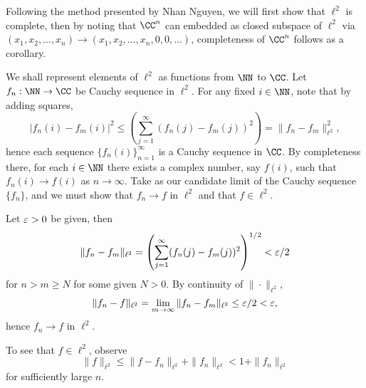 \documentclass{homework}
\begin{document}
\begin{solution}
  Following the method presented by Nhan Nguyen, we will first show that $\ell^2$ is complete, then by noting that $\CC^n$ can embedded as closed subspace of $\ell^2$ via $(x_1,x_2,\dots,x_n) \to (x_1,x_2,\dots,x_n,0,0,\dots)$, completeness of $\CC^n$ follows as a corollary.   

  We shall represent elements of $\ell^2$ as functions from $\NN$ to $\CC$.  Let $f_n:\NN \to \CC$ be Cauchy sequence in $\ell^2$.  For any  fixed $i \in \NN$, note that by adding squares,
  $$|f_n(i) - f_m(i)|^2 \le \left( \sum_{j=1}^\infty (f_n(j) - f_m(j))^2 \right) = \|f_n - f_m\|_{\ell^2}^2,$$
  hence each sequence $\{f_n(i)\}_{n=1}^\infty$ is a Cauchy sequence in $\CC$. By completeness there, for each $i \in \NN$ there exists a complex number, say $f(i)$, such that $f_n(i) \to f(i)$ as $n\to \infty$.  Take as our candidate limit of the Cauchy sequence $\{f_n \}$, and we must show that $f_n \to f$ in $\ell^2$ and that $f\in \ell^2$.

  Let $\varepsilon > 0$ be given, then 
  $$
    \| f_n - f_m \|_{\ell^2} = \left( \sum_{j=1}^\infty (f_n(j) - f_m(j) )^2\right)^{1/2} < \varepsilon/2
  $$
  for $n>m\ge N$ for some given $N>0$.  By continuity of $\| \cdot \|_{\ell^2}$,
  $$
    \|f_n - f\|_{\ell^2} = \lim_{m\to\infty}\| f_n - f_m \|_{\ell^2} \le \varepsilon/2 < \varepsilon,
  $$
  hence $f_n \to f$ in $\ell^2$.

  To see that $f\in \ell^2$, observe
  $$
    \|f\|_{\ell^2} \le \|f - f_n\|_{\ell^2} + \|f_n\|_{\ell^2} < 1 + \|f_n\|_{\ell^2}
  $$
  for sufficiently large $n$.
     
\end{solution}

\end{document}

